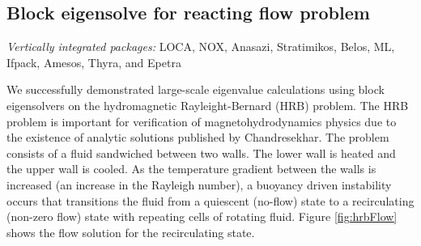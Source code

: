 \documentclass[pdf,ps2pdf,11pt]{SANDreport}
\begin{document}



%
\subsection{Block eigensolve for reacting flow problem}
%

{}\noindent\textit{Vertically integrated packages:} LOCA, NOX, Anasazi,
Stratimikos, Belos, ML, Ifpack, Amesos, Thyra, and Epetra

We successfully demonstrated large-scale eigenvalue calculations using block
eigensolvers on the hydromagnetic Rayleight-Bernard (HRB) problem.  The HRB
problem is important for verification of magnetohydrodynamics physics due to
the existence of analytic solutions published by Chandresekhar.  The problem
consists of a fluid sandwiched between two walls.  The lower wall is heated
and the upper wall is cooled.  As the temperature gradient between the walls
is increased (an increase in the Rayleigh number), a buoyancy driven
instability occurs that transitions the fluid from a quiescent (no-flow) state
to a recirculating (non-zero flow) state with repeating cells of rotating
fluid.  Figure \ref{fig:hrbFlow} shows the flow solution for the recirculating
state.
\end{document}

